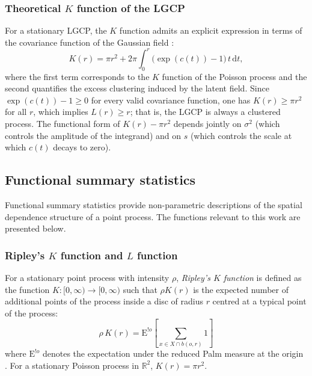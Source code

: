 \documentclass[a4paper,fleqn]{cas-sc}
\numberwithin{equation}{section}
\begin{document}
\subsubsection{Theoretical $K$ function of the LGCP}

For a stationary LGCP, the $K$ function admits an explicit expression
in terms of the covariance function of the Gaussian field
\citep{Moller1998}:
\begin{equation}
    K(r) = \pi r^2 + 2\pi\int_0^r\!\bigl(\exp(c(t))-1\bigr)\,t\,\mathrm{d}t,
    \label{eq:K_LGCP}
\end{equation}
where the first term corresponds to the $K$ function of the Poisson
process and the second quantifies the excess clustering induced by the
latent field. Since $\exp(c(t))-1\geq 0$ for every valid covariance
function, one has $K(r)\geq\pi r^2$ for all $r$, which implies
$L(r)\geq r$; that is, the LGCP is always a clustered process. The
functional form of $K(r)-\pi r^2$ depends jointly on $\sigma^2$
(which controls the amplitude of the integrand) and on $s$ (which
controls the scale at which $c(t)$ decays to zero).

\subsection{Functional summary statistics}
\label{sec:sumstats}

Functional summary statistics provide non-parametric descriptions of
the spatial dependence structure of a point process. The functions
relevant to this work are presented below.

\subsubsection{Ripley's $K$ function and $L$ function}

For a stationary point process with intensity $\rho$, \emph{Ripley's
$K$ function} \citep{Ripley76, Ripley88} is defined as the function
$K\colon[0,\infty)\to[0,\infty)$ such that $\rho K(r)$ is the expected
number of additional points of the process inside a disc of radius
$r$ centred at a typical point of the process:
\begin{equation}
    \rho\,K(r) = \mathrm{E}^{!o}\!\left[\sum_{x\in X\cap b(o,r)}1\right]
    \label{eq:K_def}
\end{equation}
where $\mathrm{E}^{!o}$ denotes the expectation under the reduced Palm
measure at the origin \citep{MollerWaagepetersen2004}. For a stationary
Poisson process in $\mathbb{R}^2$, $K(r)=\pi r^2$.
\end{document}

